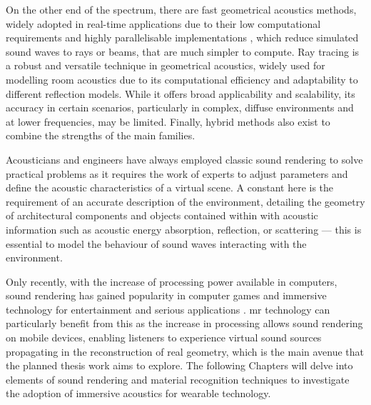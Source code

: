On the other end of the spectrum, there are fast geometrical acoustics methods, widely adopted in real-time applications due to their low computational requirements and highly parallelisable implementations \citep{cowan2010gpu}, which reduce simulated sound waves to rays or beams, that are much simpler to compute. Ray tracing is a robust and versatile technique in geometrical acoustics, widely used for modelling room acoustics due to its computational efficiency and adaptability to different reflection models. While it offers broad applicability and scalability, its accuracy in certain scenarios, particularly in complex, diffuse environments and at lower frequencies, may be limited. Finally, hybrid methods also exist to combine the strengths of the main families.\par
Acousticians and engineers have always employed classic sound rendering to solve practical problems as it requires the work of experts to adjust parameters and define the acoustic characteristics of a virtual scene. A constant here is the requirement of an accurate description of the environment, detailing the geometry of architectural components and objects contained within with acoustic information such as acoustic energy absorption, reflection, or scattering --- this is essential to model the behaviour of sound waves interacting with the environment. \par
Only recently, with the increase of processing power available in computers, sound rendering has gained popularity in computer games and immersive technology for entertainment and serious applications \citep{zhang18}. \acrshort{mr} technology can particularly benefit from this as the increase in processing allows sound rendering on mobile devices, enabling listeners to experience virtual sound sources propagating in the reconstruction of real geometry, which is the main avenue that the planned thesis work aims to explore. The following Chapters will delve into elements of sound rendering and material recognition techniques to investigate the adoption of immersive acoustics for wearable technology.\par


